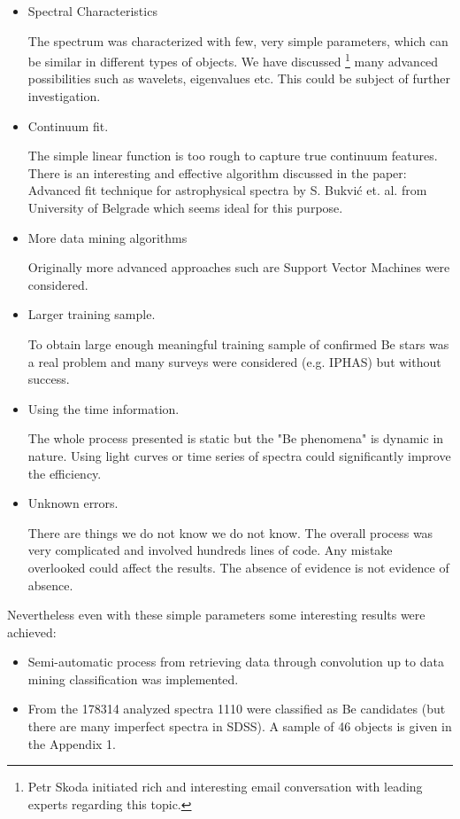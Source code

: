\begin{itemize}
\item Spectral Characteristics 

  The spectrum was characterized with few, very simple parameters,
  which can be similar in different types of objects. We have
  discussed \footnote{Petr Skoda initiated rich and interesting email
    conversation with leading experts regarding this topic.} many
  advanced possibilities such as wavelets, eigenvalues etc. This could
  be subject of further investigation.

\item Continuum fit.

  The simple linear function is too rough to capture true continuum
  features. There is an interesting and effective algorithm discussed
  in the paper: Advanced fit technique for astrophysical spectra by
  S. Bukvi{\'c} et. al. from University of Belgrade
  \citep{bukvic2008advanced} which seems ideal for this purpose.

\item More data mining algorithms

Originally more advanced approaches such are Support Vector Machines
were considered.

\item Larger training sample.

  To obtain large enough meaningful training sample of confirmed Be
  stars was a real problem and many surveys were considered
  (e.g. IPHAS) but without success.

\item Using the time information.

  The whole process presented is static but the "Be phenomena" is
  dynamic in nature. Using light curves or time series of spectra
  could significantly improve the efficiency.
\item Unknown errors. 

  There are things we do not know we do not know. The overall process
  was very complicated and involved hundreds lines of code. Any
  mistake overlooked could affect the results. The absence of evidence
  is not evidence of absence.
\end{itemize}

Nevertheless even with these simple parameters some interesting results
were achieved: 

\begin{itemize}
\item Semi-automatic process from retrieving data through convolution
  up to data mining classification was implemented.
 
\item From the 178314 analyzed spectra 1110 were classified as Be
  candidates (but there are many imperfect spectra in SDSS). A sample
  of 46 objects is given in the Appendix 1.
\end{itemize}


